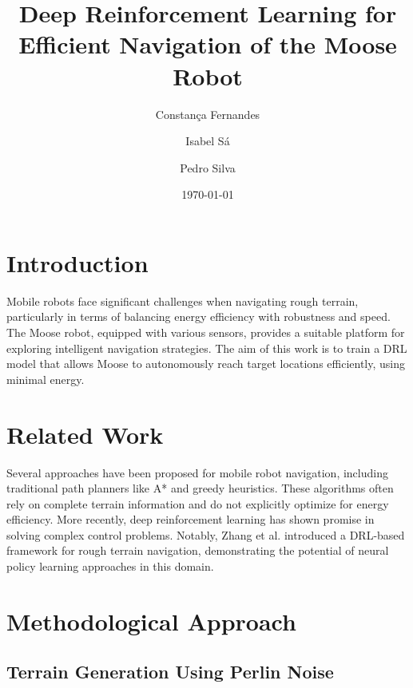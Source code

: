 \documentclass[11pt,twocolumn]{article}
\title{Deep Reinforcement Learning for Efficient Navigation of the Moose Robot}
\author{Constança Fernandes \and Isabel Sá \and Pedro Silva}
\date{\today}
\begin{document}

\section{Introduction}
Mobile robots face significant challenges when navigating rough terrain, particularly in terms of balancing energy efficiency with robustness and speed. The Moose robot, equipped with various sensors, provides a suitable platform for exploring intelligent navigation strategies. The aim of this work is to train a DRL model that allows Moose to autonomously reach target locations efficiently, using minimal energy.

\section{Related Work}

Several approaches have been proposed for mobile robot navigation, including traditional path planners like A* and greedy heuristics. These algorithms often rely on complete terrain information and do not explicitly optimize for energy efficiency. More recently, deep reinforcement learning has shown promise in solving complex control problems. Notably, Zhang et al. \cite{Zhang2018DRL} introduced a DRL-based framework for rough terrain navigation, demonstrating the potential of neural policy learning approaches in this domain.

\section{Methodological Approach}

\subsection{Terrain Generation Using Perlin Noise}
\end{document}
